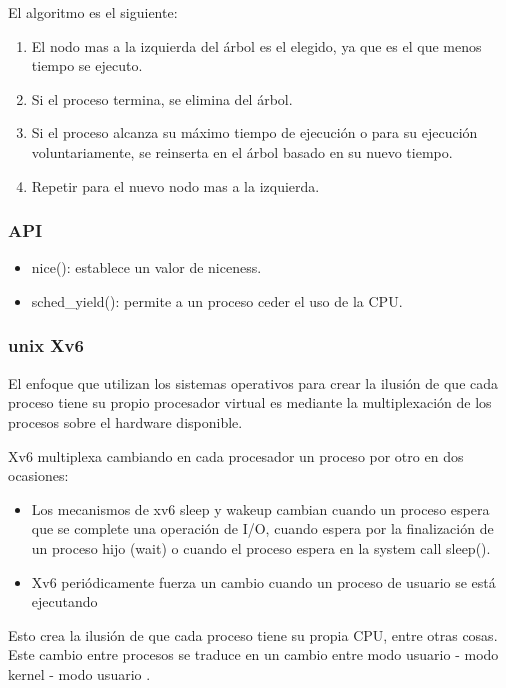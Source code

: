 \documentclass[titlepage,a4paper]{article}
\begin{document}
El algoritmo es el siguiente:
\begin{enumerate}
    \item El nodo mas a la izquierda del árbol es el elegido, ya que es el que menos tiempo se ejecuto.
    \item Si el proceso termina, se elimina del árbol.
    \item Si el proceso alcanza su máximo tiempo de ejecución o para su ejecución voluntariamente, se reinserta en el árbol basado en su nuevo tiempo.
    \item Repetir para el nuevo nodo mas a la izquierda.
\end{enumerate}

\subsubsection*{API}
\begin{itemize}
    \item nice(): establece un valor de niceness.
    \item sched\_yield(): permite a un proceso ceder el uso de la CPU.
\end{itemize}

\subsubsection*{unix Xv6}
El enfoque que utilizan los sistemas operativos para crear la ilusión de que cada proceso tiene su propio procesador virtual es mediante la multiplexación de los procesos sobre el hardware disponible.

Xv6 multiplexa cambiando en cada procesador un proceso por otro en dos ocasiones:
\begin{itemize}
    \item Los mecanismos de xv6 sleep y wakeup cambian cuando un proceso espera que se complete una operación de I/O, cuando espera por la finalización de un proceso hijo (wait) o cuando el proceso espera en la system call sleep().
    \item Xv6 periódicamente fuerza un cambio cuando un proceso de usuario se está ejecutando
\end{itemize}

Esto crea la ilusión de que cada proceso tiene su propia CPU, entre otras cosas. Este cambio entre procesos se traduce en un cambio entre modo usuario - modo kernel - modo usuario .
\end{document}
